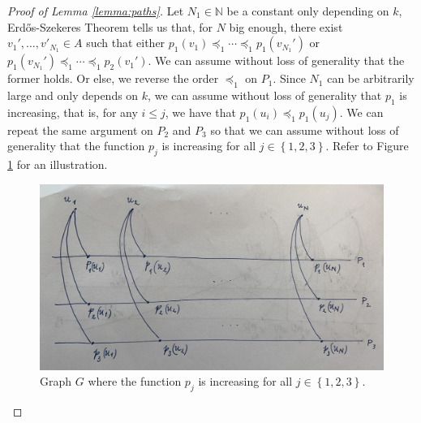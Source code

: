 \documentclass[12pt]{article}
\theoremstyle{definition}
\begin{document}
\begin{proof}[Proof of Lemma \ref{lemma:paths}]
        Let $N_{1} \in \mathbb{N}$
        be a constant only depending
        on $k$,
        Erd\H{o}s-Szekeres Theorem
        tells us that, for $N$ 
        big enough, there exist
        $v_1', \ldots, v'_{N_1} \in A$
        such that 
        either $p_1\left(v_1\right) 
        \preceq_1 \cdots
        \preceq_1 p_1\left(v_{N_1}'\right)$
        or
        $p_1\left(v_{N_1}'\right)
        \preceq_1 \cdots
        \preceq_1 p_2\left(v_1'\right)$.
        We can assume without
        loss of generality that the
        former holds.
        Or else, we reverse
        the order $\preceq_1$ on $P_1$.
        Since $N_1$ can be 
        arbitrarily large
        and only depends on $k$,
        we can assume without 
        loss of generality that
        $p_1$ is increasing,
        that is, for any $i \leq j$,
        we have that 
        $p_1\left(u_{i}\right) \preceq_1
        p_1\left(u_{j}\right)$.
        We can repeat the same
        argument on $P_2$ and $P_3$ 
        so that we can assume
        without loss of generality
        that the function $p_{j}$ 
        is increasing for all
        $j \in \left\{1, 2, 3\right\}$.
        Refer to Figure \ref{fig:Erdos} for an illustration. 
        \begin{figure}[ht]
            \centering
            \includegraphics[width=0.75\linewidth]{figures/Erdos.jpg}
            \caption{Graph $G$ where the function $p_{j}$ 
            is increasing for all $j \in \left\{1, 2, 3\right\}$.}
            \label{fig:Erdos}
        \end{figure}



\end{proof}
\end{document}
